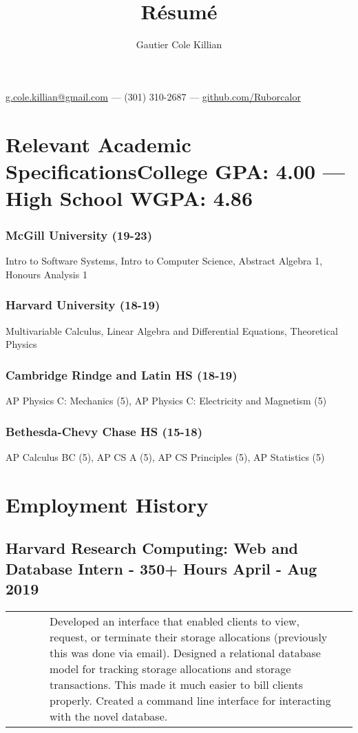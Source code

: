 \documentclass{article}
\makeatletter
\renewcommand{\maketitle}{
\begin{center}
{\color{green}\huge\bfseries
\theauthor}

\vspace{.25em}
\href{mailto:g.cole.killian@gmail.com}{g.cole.killian@gmail.com} --- (301) 310-2687 --- \href{https://github.com/Ruborcalor}{github.com/Ruborcalor} 
\end{center}
}
\makeatother
\begin{document}
\title{R\'esum\'e}
\author{Gautier Cole Killian}

\maketitle


\section{Relevant Academic Specifications\hfill\normalsize College GPA: 4.00    ---     High School WGPA: 4.86}

\subsubsection{McGill University (19-23)}
\hfill Intro to Software Systems, Intro to Computer Science, Abstract Algebra 1, Honours Analysis 1

\subsubsection{Harvard University (18-19)}
\hfill Multivariable Calculus, Linear Algebra and Differential Equations, Theoretical Physics

\subsubsection{Cambridge Rindge and Latin HS (18-19)}
\hfill AP Physics C: Mechanics (5), AP Physics C: Electricity and Magnetism (5)

\subsubsection{Bethesda-Chevy Chase HS (15-18)}
\hfill AP Calculus BC (5), AP CS A (5), AP CS Principles (5), AP Statistics (5)

\section{Employment History}

\subsection{Harvard Research Computing: Web and Database Intern - 350+ Hours \hfill April - Aug 2019\newline}

\begin{tabularx}{\linewidth}{ @{} l X r @{} }
\ \ \ \ \ & Developed an interface that enabled clients to view, request, or terminate their storage allocations (previously this was done via email). Designed a relational database model for tracking storage allocations and storage transactions. This made it much easier to bill clients properly. Created a command line interface for interacting with the novel database.&
\end{tabularx}
\end{document}
